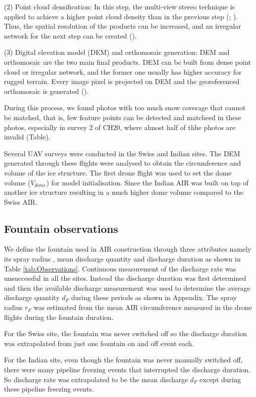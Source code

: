 \documentclass[utf8]{frontiersSCNS} %
\begin{document}
(2) Point cloud densification: In this step, the multi-view stereo technique is applied to achieve a higher point cloud
density than in the previous step (\cite{Furukawa_2010}; \cite{Molg_2017}). Thus, the spatial resolution of the
products can be increased, and an irregular network for the next step can be created (\cite{Kung_2011}).

(3) Digital elevation model (DEM) and orthomosaic generation: DEM and orthomosaic are the two main final products. DEM
can be built from dense point cloud or irregular network, and the former one usually has higher accuracy for rugged
terrain. Every image pixel is projected on DEM and the georeferenced orthomosaic is generated (\cite{Kung_2011}).

During this process, we found photos with too much snow coverage that cannot be matched, that is, few feature points can
be detected and matcheed in these photos, especially in survey 2 of CH20, where almost half of thhe photos are invalid
(Table).

Several UAV surveys were conducted in the Swiss and Indian sites. The DEM generated through these flights were
analysed to obtain the circumference and volume of the ice structure. The first drone flight was used to set the dome
volume ($V_{dome}$) for model initialisation. Since the Indian AIR was built on top of another ice structure resulting
in a much higher dome volume compared to the Swiss AIR.

\subsection{Fountain observations}
We define the fountain used in AIR construction through three attributes namely its spray radius , mean discharge
quantity and discharge duration as shown in Table \ref{tab:Observations}. Continuous measurement of the discharge rate
was unsuccessful in all the sites. Instead the discharge duration was first determined and then the available discharge
measurement was used to determine the average discharge quantity $d_F$ during these periods as shown in Appendix. The
spray radius $r_F$ was estimated from the mean AIR circumference measured in the drone flights during the fountain
duration.

For the Swiss site, the fountain was never switched off so the discharge duration was extrapolated from just one fountain
on and off event each.

For the Indian site, even though the fountain was never manually switched off, there were many pipeline freezing events that
interrupted the discharge duration. So discharge rate was extrapolated to be the mean discharge $d_F$ except during
these pipeline freezing events.
\end{document}
